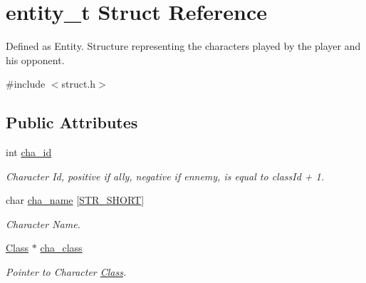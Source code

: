\hypertarget{structentity__t}{}\section{entity\+\_\+t Struct Reference}
\label{structentity__t}


Defined as Entity. Structure representing the characters played by the player and his opponent.  




{\ttfamily \#include $<$struct.\+h$>$}

\subsection*{Public Attributes}
\begin{DoxyCompactItemize}
\item 
\mbox{\label{structentity__t_a218503eec9e98ad9b098b4f3337fd759}} 
int \hyperlink{structentity__t_a218503eec9e98ad9b098b4f3337fd759}{cha\+\_\+id}
\begin{DoxyCompactList}\small\item\em Character Id, positive if ally, negative if ennemy, is equal to class\+Id + 1. \end{DoxyCompactList}\item 
\mbox{\label{structentity__t_afb57034f4fd8ef96d972076ecd2a9349}} 
char \hyperlink{structentity__t_afb57034f4fd8ef96d972076ecd2a9349}{cha\+\_\+name} \mbox{[}\hyperlink{common_8h_adea6e0778ed738e315a134cb865c141f}{S\+T\+R\+\_\+\+S\+H\+O\+RT}\mbox{]}
\begin{DoxyCompactList}\small\item\em Character Name. \end{DoxyCompactList}\item 
\mbox{\label{structentity__t_a3abf9c71d2774124d4fa016df4754142}} 
\hyperlink{struct_class}{Class} $\ast$ \hyperlink{structentity__t_a3abf9c71d2774124d4fa016df4754142}{cha\+\_\+class}
\begin{DoxyCompactList}\small\item\em Pointer to Character \hyperlink{struct_class}{Class}. \end{DoxyCompactList}\item 
\mbox{\label{structentity__t_a0d70a87514cf7efe85191e3c017d573a}} 

\end{DoxyCompactItemize}
